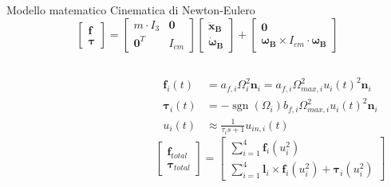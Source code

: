 \documentclass[]{beamer}
\DeclareMathOperator*{\sgn}{sgn}                %
\begin{document}
	\begin{frame}{Modello matematico}
		\centering
		Cinematica di Newton-Eulero
		\begin{equation*}
			\begin{bmatrix}
				\mathbf{f}        \\
				\boldsymbol{\tau}
			\end{bmatrix}
			=
			\begin{bmatrix}
				m \cdot I_{3} & \mathbf{0} \\
				\mathbf{0}^T          & I_{cm}
			\end{bmatrix}
			\begin{bmatrix}
				\mathbf{\ddot{x}_B}         \\
				\boldsymbol{\dot{\omega}_B}
			\end{bmatrix}
			+
			\begin{bmatrix}
				\mathbf{0}                                                      \\
				\boldsymbol{\omega_B} \times I_{cm} \cdot \boldsymbol{\omega_B}
			\end{bmatrix}
		\end{equation*}
		\begin{columns}
			\begin{column}{.55\textwidth}
				\centering
				\begin{figure}
					
				\end{figure}
			\end{column}
			\begin{column}{.55\textwidth}
				\centering
				\small
				\begin{align*}
					\mathbf{f}_i(t) &= a_{f,i}\Omega_i^2\mathbf{n}_i = a_{f,i}\Omega_{max, i}^2 u_i(t)^2\mathbf{n}_i \\
					\boldsymbol{\tau}_i(t) &= -\sgn(\Omega_i)b_{f,i}\Omega_{max,i}^2u_i(t)^2\mathbf{n}_i \\
					u_i(t) &\approx \frac{1}{\tau_i s+1}u_{in,i}(t)
				\end{align*}
				\begin{equation*}
					\begin{bmatrix}
						\mathbf{f}_{total} \\
						\boldsymbol{\tau}_{total}
					\end{bmatrix}
					=
					\begin{bmatrix}
						\sum\limits_{i=1}^{4} \mathbf{f}_i(u_i^2) \\
						\sum\limits_{i=1}^{4} \mathbf{l}_i \times \mathbf{f}_i(u_i^2) + \boldsymbol{\tau}_i(u_i^2)
					\end{bmatrix}
				\end{equation*}
			\end{column}
		\end{columns}
	\end{frame}
	
\end{document}

